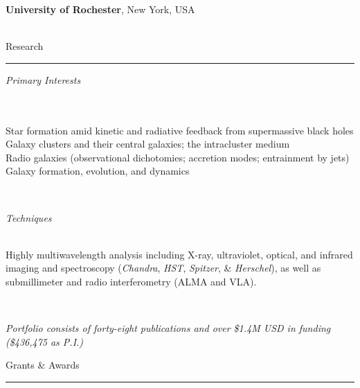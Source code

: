 \documentclass[11pt]{article}
\makeatletter
\def\vhrulefill#1{\leavevmode\leaders\hrule\@height#1\hfill \kern\z@}
\makeatother
\begin{document}
\hspace{42mm} \parbox{5.15in}{{\bf University of Rochester}, New York, USA} \\



{\sc Research}  \vhrulefill{0.4pt}

\vspace{4mm}

\hspace{2.5mm} \parbox{1.5in}{{\it Primary Interests \\\\\\}} \parbox{5.15in}{Star formation amid kinetic and radiative feedback from supermassive black holes \\ Galaxy clusters and their central galaxies; the intracluster medium \\ Radio galaxies (observational dichotomies; accretion modes; entrainment by jets) \\ Galaxy formation, evolution, and dynamics  } \\


\vspace{4mm}

\hspace{2.5mm} \parbox{1.5in}{{\it Techniques \\\\}} \parbox{5.15in}{Highly multiwavelength analysis including X-ray, ultraviolet, optical, and infrared imaging and spectroscopy ({\it Chandra}, {\it HST}, {\it Spitzer}, \& {\it Herschel}), as well as submillimeter and radio interferometry (ALMA and VLA).  } \\

\vspace*{-3mm}

\begin{center}
{\it Portfolio consists of forty-eight publications and over \$1.4M USD in funding (\$436,475 as P.I.)}  \\
\end{center}


\clearpage


{\sc Grants \& Awards} \vhrulefill{0.4pt} 
\end{document}
